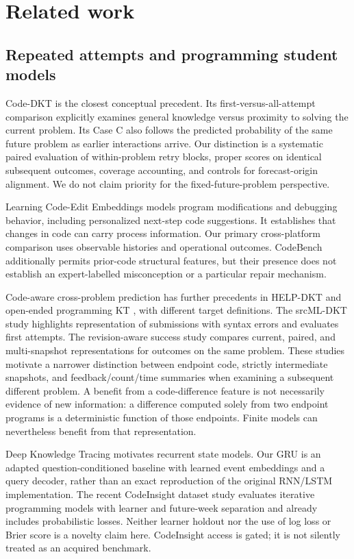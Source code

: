 \documentclass[11pt]{article}
\newcommand{\1}{\mathbb{I}}
\begin{document}
\section{Related work}
\subsection{Repeated attempts and programming student models}
Code-DKT \cite{shi2022codedkt} is the closest conceptual precedent. Its first-versus-all-attempt comparison explicitly examines general knowledge versus proximity to solving the current problem. Its Case C also follows the predicted probability of the same future problem as earlier interactions arrive. Our distinction is a systematic paired evaluation of within-problem retry blocks, proper scores on identical subsequent outcomes, coverage accounting, and controls for forecast-origin alignment. We do not claim priority for the fixed-future-problem perspective.

Learning Code-Edit Embeddings \cite{heickal2025codeedit} models program modifications and debugging behavior, including personalized next-step code suggestions. It establishes that changes in code can carry process information. Our primary cross-platform comparison uses observable histories and operational outcomes. CodeBench additionally permits prior-code structural features, but their presence does not establish an expert-labelled misconception or a particular repair mechanism.

Code-aware cross-problem prediction has further precedents in HELP-DKT \cite{liang2022helpdkt} and open-ended programming KT \cite{liu2022oktworkshop}, with different target definitions. The srcML-DKT study \cite{pankiewicz2025srcmldkt} highlights representation of submissions with syntax errors and evaluates first attempts. The revision-aware success study \cite{amin2026revisionaware} compares current, paired, and multi-snapshot representations for outcomes on the same problem. These studies motivate a narrower distinction between endpoint code, strictly intermediate snapshots, and feedback/count/time summaries when examining a subsequent different problem. A benefit from a code-difference feature is not necessarily evidence of new information: a difference computed solely from two endpoint programs is a deterministic function of those endpoints. Finite models can nevertheless benefit from that representation.

Deep Knowledge Tracing \cite{piech2015dkt} motivates recurrent state models. Our GRU is an adapted question-conditioned baseline with learned event embeddings and a query decoder, rather than an exact reproduction of the original RNN/LSTM implementation. The recent CodeInsight dataset study \cite{patel2026codeinsight} evaluates iterative programming models with learner and future-week separation and already includes probabilistic losses. Neither learner holdout nor the use of log loss or Brier score is a novelty claim here. CodeInsight access is gated; it is not silently treated as an acquired benchmark.
\end{document}
